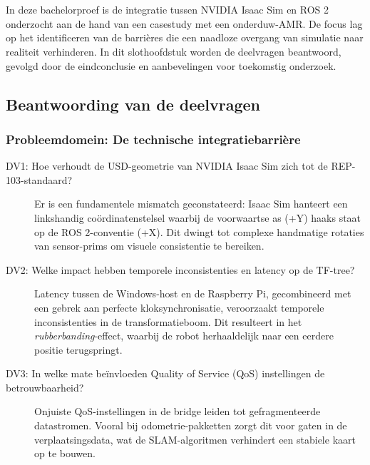 
\chapter{}
\label{ch:conclusie}

In deze bachelorproef is de integratie tussen NVIDIA Isaac Sim en ROS 2 onderzocht aan de hand van een casestudy met een onderduw-AMR. De focus lag op het identificeren van de barrières die een naadloze overgang van simulatie naar realiteit verhinderen. In dit slothoofdstuk worden de deelvragen beantwoord, gevolgd door de eindconclusie en aanbevelingen voor toekomstig onderzoek.

\section{Beantwoording van de deelvragen}
\label{sec:beantwoording_deelvragen}

\subsection{Probleemdomein: De technische integratiebarrière}
\begin{description}
    \item[DV1: Hoe verhoudt de USD-geometrie van NVIDIA Isaac Sim zich tot de REP-103-standaard?] Er is een fundamentele mismatch geconstateerd: Isaac Sim hanteert een linkshandig coördinatenstelsel waarbij de voorwaartse as (+Y) haaks staat op de ROS 2-conventie (+X). Dit dwingt tot complexe handmatige rotaties van sensor-prims om visuele consistentie te bereiken.
    
    \item[DV2: Welke impact hebben temporele inconsistenties en latency op de TF-tree?] Latency tussen de Windows-host en de Raspberry Pi, gecombineerd met een gebrek aan perfecte kloksynchronisatie, veroorzaakt temporele inconsistenties in de transformatieboom. Dit resulteert in het \textit{rubberbanding}-effect, waarbij de robot herhaaldelijk naar een eerdere positie terugspringt.
    
    \item[DV3: In welke mate beïnvloeden Quality of Service (QoS) instellingen de betrouwbaarheid?] Onjuiste QoS-instellingen in de bridge leiden tot gefragmenteerde datastromen. Vooral bij odometrie-pakketten zorgt dit voor gaten in de verplaatsingsdata, wat de SLAM-algoritmen verhindert een stabiele kaart op te bouwen.
\end{description}

